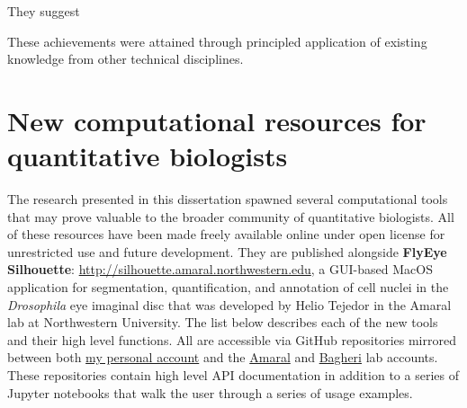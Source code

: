 They suggest 

These achievements were attained through principled application of existing knowledge from other technical disciplines.







\section{New computational resources for quantitative biologists}

The research presented in this dissertation spawned several computational tools that may prove valuable to the broader community of quantitative biologists. All of these resources have been made freely available online under open license for unrestricted use and future development. They are published alongside \textbf{FlyEye Silhouette}: \url{http://silhouette.amaral.northwestern.edu}, a GUI-based MacOS application for segmentation, quantification, and annotation of cell nuclei in the \textit{Drosophila} eye imaginal disc that was developed by Helio Tejedor in the Amaral lab at Northwestern University. The list below describes each of the new tools and their high level functions. All are accessible via GitHub repositories mirrored between both \href{https://github.com/sebastianbernasek/}{my personal account} and the \href{https://github.com/amarallab}{Amaral} and \href{https://github.com/bagherilab}{Bagheri} lab accounts. These repositories contain high level API documentation in addition to a series of Jupyter notebooks that walk the user through a series of usage examples. 

